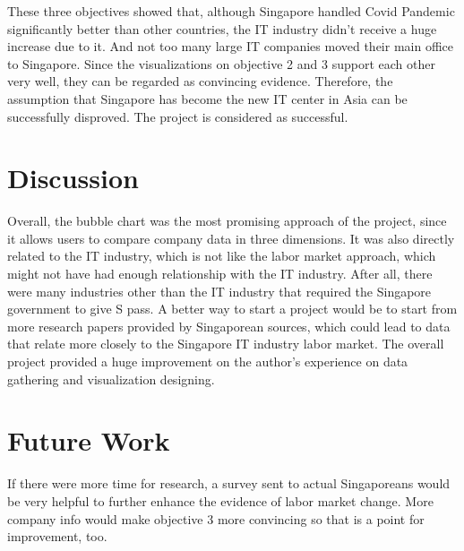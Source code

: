 \documentclass[conference]{IEEEtran}
\begin{document}
These three objectives showed that, although Singapore handled Covid Pandemic significantly better than other countries, the IT industry didn’t receive a huge increase due to it. And not too many large IT companies moved their main office to Singapore. Since the visualizations on objective 2 and 3 support each other very well, they can be regarded as convincing evidence.
Therefore, the assumption that Singapore has become the new IT center in Asia can be successfully disproved. The project is considered as successful.

\section{Discussion}

Overall, the bubble chart was the most promising approach of the project, since it allows users to compare company data in three dimensions. It was also directly related to the IT industry, which is not like the labor market approach, which might not have had enough relationship with the IT industry. After all, there were many industries other than the IT industry that required the Singapore government to give S pass. A better way to start a project would be to start from more research papers provided by Singaporean sources, which could lead to data that relate more closely to the Singapore IT industry labor market. The overall project provided a huge improvement on the author’s experience on data gathering and visualization designing.

\section{Future Work}

If there were more time for research, a survey sent to actual Singaporeans would be very helpful to further enhance the evidence of labor market change. More company info would make objective 3 more convincing so that is a point for improvement, too.






\end{document}
